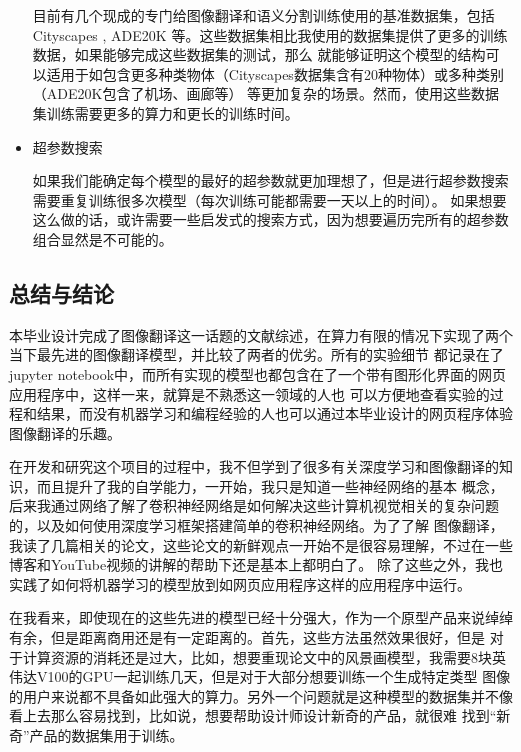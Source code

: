 \documentclass[supercite]{HustGraduPaper}
\theoremstyle{definition}
\begin{document}
\begin{itemize}
  目前有几个现成的专门给图像翻译和语义分割训练使用的基准数据集，包括Cityscapes \cite{Cordts2016Cityscapes}, 
  ADE20K \cite{zhou2017scene}等。这些数据集相比我使用的数据集提供了更多的训练数据，如果能够完成这些数据集的测试，那么
  就能够证明这个模型的结构可以适用于如包含更多种类物体（Cityscapes数据集含有20种物体）或多种类别（ADE20K包含了机场、画廊等）
  等更加复杂的场景。然而，使用这些数据集训练需要更多的算力和更长的训练时间。
  \item 超参数搜索
  
  如果我们能确定每个模型的最好的超参数就更加理想了，但是进行超参数搜索需要重复训练很多次模型（每次训练可能都需要一天以上的时间）。
  如果想要这么做的话，或许需要一些启发式的搜索方式，因为想要遍历完所有的超参数组合显然是不可能的。
\end{itemize}

\subsection{总结与结论}

本毕业设计完成了图像翻译这一话题的文献综述，在算力有限的情况下实现了两个当下最先进的图像翻译模型，并比较了两者的优劣。所有的实验细节
都记录在了jupyter notebook中，而所有实现的模型也都包含在了一个带有图形化界面的网页应用程序中，这样一来，就算是不熟悉这一领域的人也
可以方便地查看实验的过程和结果，而没有机器学习和编程经验的人也可以通过本毕业设计的网页程序体验图像翻译的乐趣。

在开发和研究这个项目的过程中，我不但学到了很多有关深度学习和图像翻译的知识，而且提升了我的自学能力，一开始，我只是知道一些神经网络的基本
概念，后来我通过网络了解了卷积神经网络是如何解决这些计算机视觉相关的复杂问题的，以及如何使用深度学习框架搭建简单的卷积神经网络。为了了解
图像翻译，我读了几篇相关的论文，这些论文的新鲜观点一开始不是很容易理解，不过在一些博客和YouTube视频的讲解的帮助下还是基本上都明白了。
除了这些之外，我也实践了如何将机器学习的模型放到如网页应用程序这样的应用程序中运行。

在我看来，即使现在的这些先进的模型已经十分强大，作为一个原型产品来说绰绰有余，但是距离商用还是有一定距离的。首先，这些方法虽然效果很好，但是
对于计算资源的消耗还是过大，比如，想要重现论文中的风景画模型，我需要8块英伟达V100的GPU一起训练几天，但是对于大部分想要训练一个生成特定类型
图像的用户来说都不具备如此强大的算力。另外一个问题就是这种模型的数据集并不像看上去那么容易找到，比如说，想要帮助设计师设计新奇的产品，就很难
找到“新奇”产品的数据集用于训练。
\end{document}
